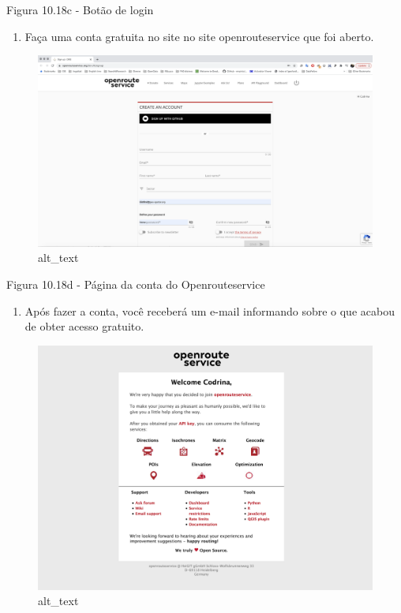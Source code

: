 \documentclass[
  portuguese,
]{krantz}
\providecommand{\tightlist}{%
  \setlength{\itemsep}{0pt}\setlength{\parskip}{0pt}}
\begin{document}
Figura 10.18c - Botão de login

\begin{enumerate}
\def\labelenumi{\arabic{enumi}.}
\setcounter{enumi}{1}
\tightlist
\item
  Faça uma conta gratuita no site no site openrouteservice que foi aberto.
\end{enumerate}

\begin{figure}
\centering
\includegraphics{media/modulo10/fig1018_d.png}
\caption{alt\_text}
\end{figure}

Figura 10.18d - Página da conta do Openrouteservice

\begin{enumerate}
\def\labelenumi{\arabic{enumi}.}
\setcounter{enumi}{2}
\tightlist
\item
  Após fazer a conta, você receberá um e-mail informando sobre o que acabou de obter acesso gratuito.
\end{enumerate}

\begin{figure}
\centering
\includegraphics{media/modulo10/fig1018_e.png}
\caption{alt\_text}
\end{figure}
\end{document}
